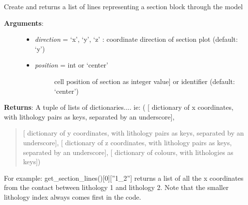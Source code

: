 \documentclass[a4paper,10pt,english]{sphinxmanual}
\begin{document}
\begin{fulllineitems}
\begin{fulllineitems}
\begin{description}
\begin{itemize}
\end{itemize}

\end{description}

\end{fulllineitems}


\begin{fulllineitems}
\label{pynoddy:pynoddy.output.NoddyOutput.get_section_lines}
Create and returns a list of lines representing a section block through the model
\begin{description}
\item[{\textbf{Arguments}:}] \leavevmode\begin{itemize}
\item {} 
\emph{direction} = `x', `y', `z' : coordinate direction of section plot (default: `y')

\item {} \begin{description}
\item[{\emph{position} = int or `center'}] \leavevmode{[}cell position of section as integer value{]}
or identifier (default: `center')

\end{description}

\end{itemize}

\end{description}

\textbf{Returns}:
A tuple of lists of dictionaries.... ie:
( {[} dictionary of x coordinates, with lithology pairs as keys, separated by an underscore{]},
\begin{quote}

{[} dictionary of y coordinates, with lithology pairs as keys, separated by an underscore{]},
{[} dictionary of z coordinates, with lithology pairs as keys, separated by an underscore{]},
{[} dictionary of colours, with lithologies as keys{]})
\end{quote}

For example: get\_section\_lines(){[}0{]}{[}''1\_2''{]} returns a list of all the x coordinates from the 
contact between lithology 1 and lithology 2. Note that the smaller lithology index always
comes first in the code.

\end{fulllineitems}


\end{fulllineitems}
\end{document}
